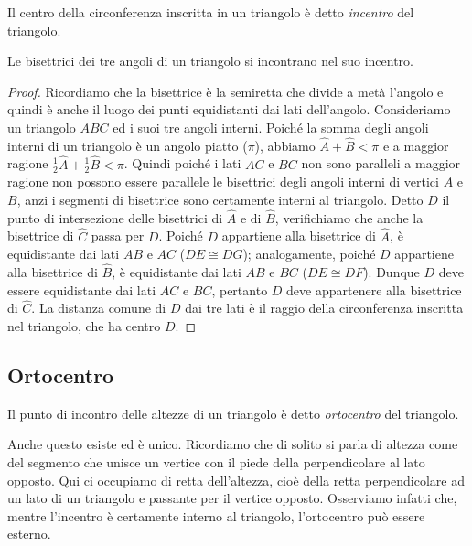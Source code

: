\begin{definizione}
Il centro della circonferenza inscritta in un triangolo è detto \emph{incentro} del triangolo.
\end{definizione}

\begin{teorema}
Le bisettrici dei tre angoli di un triangolo si incontrano nel suo incentro.
\end{teorema}

\begin{figure}[htb]
	\centering
\end{figure}
\begin{proof}
Ricordiamo che la bisettrice è la semiretta che divide a metà l'angolo e quindi è anche il luogo dei punti equidistanti dai lati dell'angolo. Consideriamo un triangolo $ABC$ ed i suoi tre angoli interni. Poiché la somma degli angoli interni di un triangolo è un angolo piatto ($\pi$), abbiamo $\widehat{A}+\widehat{B}<\pi$ e a maggior ragione $\frac{1}{2}\widehat{A}+\frac{1}{2}\widehat{B}<\pi$. Quindi poiché i lati $AC$ e $BC$ non sono paralleli a maggior ragione non possono essere parallele le bisettrici degli angoli interni di vertici $A$ e $B$, anzi i segmenti di bisettrice sono certamente interni al triangolo. Detto $D$ il punto di intersezione delle bisettrici di $\widehat{A}$ e di $\widehat{B}$, verifichiamo che anche la bisettrice di $\widehat{C}$ passa per $D$. Poiché $D$ appartiene alla bisettrice di $\widehat{A}$, è equidistante dai lati $AB$ e $AC$ ($DE\cong DG$); analogamente, poiché $D$ appartiene alla bisettrice di $\widehat{B}$, è equidistante dai lati $AB$ e $BC$ ($DE\cong DF$). Dunque $D$ deve essere equidistante dai lati $AC$ e $BC$, pertanto $D$ deve appartenere alla bisettrice di $\widehat{C}$. La distanza comune di $D$ dai tre lati è il raggio della circonferenza inscritta nel triangolo, che ha centro $D$.
\end{proof}

\subsection{Ortocentro}

\begin{definizione}
Il punto di incontro delle altezze di un triangolo è detto \emph{ortocentro} del triangolo.
\end{definizione}

Anche questo esiste ed è unico. Ricordiamo che di solito si parla di altezza come del segmento che unisce un vertice con il piede della perpendicolare al lato opposto. Qui ci occupiamo di retta dell'altezza, cioè della retta perpendicolare ad un lato di un triangolo e passante per il vertice opposto. Osserviamo infatti che, mentre l'incentro è certamente interno al triangolo, l'ortocentro può essere esterno.

